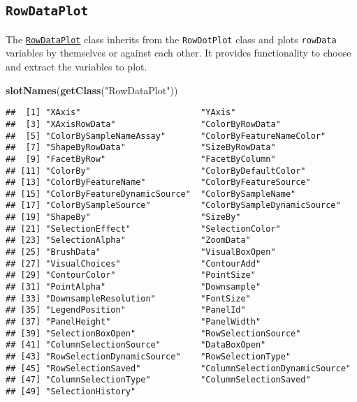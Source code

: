 \documentclass[
]{book}
\newenvironment{Shaded}{\begin{snugshade}}{\end{snugshade}}
\newcommand{\KeywordTok}[1]{\textcolor[rgb]{0.13,0.29,0.53}{\textbf{#1}}}
\newcommand{\NormalTok}[1]{#1}
\newcommand{\StringTok}[1]{\textcolor[rgb]{0.31,0.60,0.02}{#1}}
\begin{document}
\hypertarget{rowdataplot}{%
\subsection{\texorpdfstring{\texttt{RowDataPlot}}{RowDataPlot}}\label{rowdataplot}}

The \href{https://isee.github.io/iSEE/reference/RowDataPlot-class.html}{\texttt{RowDataPlot}} class inherits from the \texttt{RowDotPlot} class and plots \texttt{rowData} variables by themselves or against each other.
It provides functionality to choose and extract the variables to plot.

\begin{Shaded}
\begin{Highlighting}[]
\KeywordTok{slotNames}\NormalTok{(}\KeywordTok{getClass}\NormalTok{(}\StringTok{"RowDataPlot"}\NormalTok{))}
\end{Highlighting}
\end{Shaded}

\begin{verbatim}
##  [1] "XAxis"                        "YAxis"                       
##  [3] "XAxisRowData"                 "ColorByRowData"              
##  [5] "ColorBySampleNameAssay"       "ColorByFeatureNameColor"     
##  [7] "ShapeByRowData"               "SizeByRowData"               
##  [9] "FacetByRow"                   "FacetByColumn"               
## [11] "ColorBy"                      "ColorByDefaultColor"         
## [13] "ColorByFeatureName"           "ColorByFeatureSource"        
## [15] "ColorByFeatureDynamicSource"  "ColorBySampleName"           
## [17] "ColorBySampleSource"          "ColorBySampleDynamicSource"  
## [19] "ShapeBy"                      "SizeBy"                      
## [21] "SelectionEffect"              "SelectionColor"              
## [23] "SelectionAlpha"               "ZoomData"                    
## [25] "BrushData"                    "VisualBoxOpen"               
## [27] "VisualChoices"                "ContourAdd"                  
## [29] "ContourColor"                 "PointSize"                   
## [31] "PointAlpha"                   "Downsample"                  
## [33] "DownsampleResolution"         "FontSize"                    
## [35] "LegendPosition"               "PanelId"                     
## [37] "PanelHeight"                  "PanelWidth"                  
## [39] "SelectionBoxOpen"             "RowSelectionSource"          
## [41] "ColumnSelectionSource"        "DataBoxOpen"                 
## [43] "RowSelectionDynamicSource"    "RowSelectionType"            
## [45] "RowSelectionSaved"            "ColumnSelectionDynamicSource"
## [47] "ColumnSelectionType"          "ColumnSelectionSaved"        
## [49] "SelectionHistory"
\end{verbatim}
\end{document}
